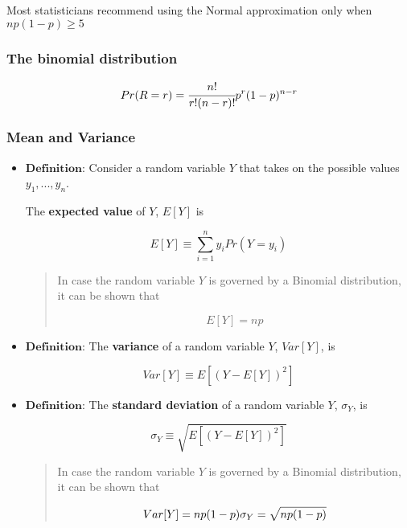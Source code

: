 Most statisticians recommend using the Normal approximation only when
\(np(1-p)\ge5\)

\hypertarget{the-binomial-distribution}{%
\subsubsection{The binomial
distribution}\label{the-binomial-distribution}}

\[Pr(R=r)=\cfrac{n!}{r!(n-r)!}p^r(1-p)^{n-r}\]

\hypertarget{mean-and-variance}{%
\subsubsection{Mean and Variance}\label{mean-and-variance}}

\begin{itemize}
\item
  \(\textbf{Definition}\): Consider a random variable \(Y\) that takes
  on the possible values \(y_1, ..., y_n\).

  The \textbf{expected value} of \(Y\), \(E[Y]\) is

  \[E[Y]\equiv\sum^n_{i=1}y_iPr(Y=y_i)\]

  \begin{quote}
  In case the random variable \(Y\) is governed by a Binomial
  distribution, it can be shown that

  \[E[Y]=np\]
  \end{quote}
\item
  \(\textbf{Definition}\): The \textbf{variance} of a random variable
  \(Y\), \(Var[Y]\), is

  \[Var[Y]\equiv E[(Y-E[Y])^2]\]
\end{itemize}

\begin{itemize}
\item
  \(\textbf{Definition}\): The \textbf{standard deviation} of a random
  variable \(Y\), \(\sigma_Y\), is

  \[\sigma_Y\equiv\sqrt{E[(Y-E[Y])^2]}\]

  \begin{quote}
  In case the random variable \(Y\) is governed by a Binomial
  distribution, it can be shown that

  \[Var[Y]=np(1-p)\\
  \sigma_Y=\sqrt{np(1-p)}\]
  \end{quote}
\end{itemize}

